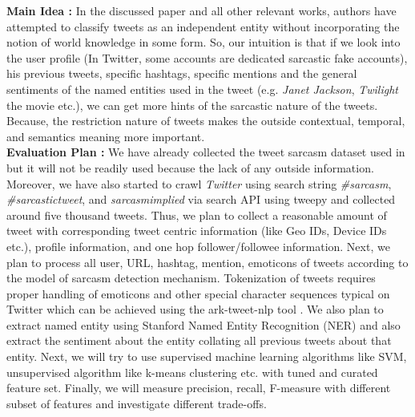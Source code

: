 \noindent \textbf{Main Idea :} In the discussed paper and all other relevant works, authors have attempted to classify tweets as an independent entity without incorporating the notion of world knowledge in some form. So, our intuition is that if we look into the user profile (In Twitter, some accounts are dedicated sarcastic fake accounts), his previous tweets, specific hashtags, specific mentions and the general sentiments of the named entities used in the tweet (e.g. \textit{Janet Jackson}, \textit{Twilight} the movie etc.), we can get more hints of the sarcastic nature of the tweets. Because, the restriction nature of tweets makes the outside contextual, temporal, and semantics meaning more important.\\

\noindent \textbf{Evaluation Plan :}
We have already collected the tweet sarcasm dataset used in \cite{davidov10} but it will not be readily used because the lack of any outside information. Moreover, we have also started to crawl \textit{Twitter} using search string \textit{\#sarcasm}, \textit{\#sarcastictweet}, and \textit{sarcasmimplied} via search API using tweepy\cite{tweepy} and collected around five thousand tweets. Thus, we plan to collect a reasonable amount of tweet with corresponding tweet centric information (like Geo IDs, Device IDs etc.), profile information, and one hop follower/followee information. Next, we plan to process all user, URL, hashtag, mention, emoticons of tweets according to the model of sarcasm detection mechanism. Tokenization of tweets requires proper handling of emoticons and other special character sequences
typical on Twitter which can be achieved using the ark-tweet-nlp tool \cite{gimpel11}. We also plan to extract named entity using Stanford Named Entity Recognition (NER) and also extract the sentiment about the entity collating all previous tweets about that entity. Next, we will try to use supervised machine learning algorithms like SVM, unsupervised algorithm like k-means clustering etc. with tuned and curated feature set. Finally, we will measure precision, recall, F-measure with different subset of features and investigate different trade-offs. 
